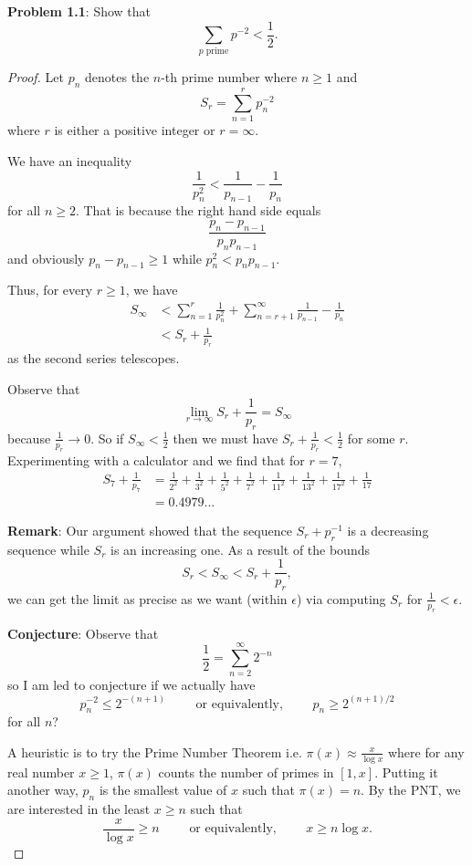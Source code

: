 \documentclass{article}
\begin{document}
\textbf{Problem 1.1}: Show that
$$\sum_{p \text{ prime}} p^{-2} < \frac{1}{2}.$$

\begin{proof}
Let $p_n$ denotes the $n$-th prime number where $n \geq 1$ and
$$S_r = \sum_{n = 1}^{r} p_n^{-2}$$
where $r$ is either a positive integer or $r = \infty$.

We have an inequality
$$\frac{1}{p_n^2} < \frac{1}{p_{n-1}} - \frac{1}{p_n}$$
for all $n \geq 2$. That is because the right hand side equals
$$\frac{p_n - p_{n-1}}{p_n p_{n-1}}$$
and obviously $p_n - p_{n-1} \geq 1$ while $p_n^2 < p_n p_{n-1}$.

Thus, for every $r \geq 1$, we have
\begin{align*}
S_\infty &< \sum_{n=1}^{r} \frac{1}{p_n^2} + \sum_{n = r+1}^{\infty} \frac{1}{p_{n-1}} - \frac{1}{p_n} \\
&< S_r + \frac{1}{p_r}
\end{align*}
as the second series telescopes.

Observe that
$$\lim_{r \rightarrow \infty} S_r + \frac{1}{p_r} = S_\infty$$
because $\frac{1}{p_r} \rightarrow 0$.
So if $S_\infty < \frac{1}{2}$ then we must have $S_r + \frac{1}{p_r} < \frac{1}{2}$ for some $r$.
Experimenting with a calculator and we find that for $r = 7$,
\begin{align*}
S_7 + \frac{1}{p_7} &= \frac{1}{2^2} + \frac{1}{3^2} + \frac{1}{5^2} + \frac{1}{7^2} + \frac{1}{11^2} + \frac{1}{13^2} + \frac{1}{17^2} + \frac{1}{17}\\
&= 0.4979...
\end{align*}

\textbf{Remark}: Our argument showed that the sequence $S_r + p_r^{-1}$ is a decreasing sequence while $S_r$ is an increasing one. As a result of the bounds
$$S_r < S_\infty < S_r + \frac{1}{p_r},$$
we can get the limit as precise as we want (within $\epsilon$) via computing $S_r$ for $\frac{1}{p_r} < \epsilon$.

\textbf{Conjecture}: Observe that
$$\frac{1}{2} = \sum_{n=2}^{\infty} 2^{-n}$$
so I am led to conjecture if we actually have
$$p_n^{-2} \leq 2^{-(n+1)} \qquad \text{ or equivalently, } \qquad p_n \geq 2^{(n+1)/2}$$
for all $n$?

A heuristic is to try the Prime Number Theorem i.e. $\pi(x) \approx \frac{x}{\log x}$ where for any real number $x \geq 1$, $\pi(x)$ counts the number of primes in $[1, x]$. Putting it another way, $p_n$ is the smallest value of $x$ such that $\pi(x) = n$. By the PNT, we are interested in the least $x \geq n$ such that
$$\frac{x}{\log x} \geq n \qquad \text{ or equivalently, } \qquad x \geq n \log x.$$


\end{proof}
\end{document}
